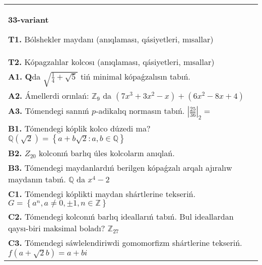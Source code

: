 \documentclass{article}
\begin{document}
\begin{tabular}{m{17cm}}
\textbf{33-variant}
\newline

\textbf{T1.} Bólshekler maydanı (anıqlaması, qásiyetleri, mısallar) \\
\textbf{T2.} Kópagzalılar kolcosı (anıqlaması, qásiyetleri, mısallar) \\
\textbf{A1.} \(\mathbf{Q}\)da \(\sqrt{\frac{1}{4} + \sqrt{5}}\) tiń minimal kópaǵzalısın tabıń. \\
\textbf{A2.} Ámellerdi orınlań: \(\mathbb{Z}_{9}\) da \(\left( 7x^{3} + 3x^{2} - x \right) + \left( 6x^{2} - 8x + 4 \right)\) \\
\textbf{A3.} Tómendegi sannıń \(p\)-adikalıq normasın tabıń. \(|\frac{25}{36}|_{2} =\) \\
\textbf{B1.} Tómendegi kóplik kolco dúzedi ma? \(\mathbb{Q}\left( \sqrt{2} \right) = \left\{ a + b\sqrt{2}:a,b \in \mathbb{Q} \right\}\) \\
\textbf{B2.} \(Z_{20}\) kolconıń barlıq úles kolcoların anıqlań. \\
\textbf{B3.} Tómendegi maydanlardıń berilgen kópaǵzalı arqalı ajıralıw maydanın tabıń. \(\mathbb{Q}\) da \(x^{4} - 2\) \\
\textbf{C1.} Tómendegi kóplikti maydan shártlerine tekseriń. \(G = \left\{ a^{n},a \neq 0, \pm 1,n \in \mathbb{Z} \right\}\) \\
\textbf{C2.} Tómendegi kolconıń barlıq ideallarıń tabıń. Bul ideallardan qaysı-biri maksimal boladı? \(\mathbb{Z}_{27}\) \\
\textbf{C3.} Tómendegi sáwlelendiriwdi gomomorfizm shártlerine tekseriń. \(f\left( a + \sqrt{2}b \right) = a + bi\) \\

\end{tabular}
\vspace{1cm}
\end{document}
